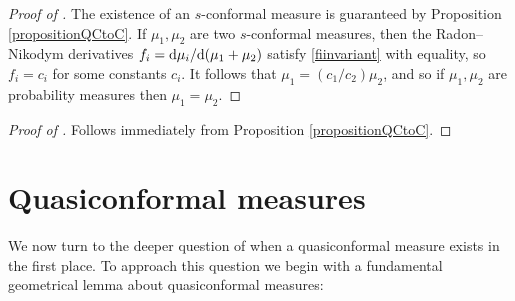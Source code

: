 \begin{proof}[Proof of ]
The existence of an $s$-conformal measure is guaranteed by Proposition \ref{propositionQCtoC}. If $\mu_1,\mu_2$ are two $s$-conformal measures, then the Radon--Nikodym derivatives $f_i = \mathrm{d}\mu_i/\mathrm{d}(\mu_1 + \mu_2)$ satisfy \eqref{fiinvariant} with equality, so $f_i = c_i$ for some constants $c_i$. It follows that $\mu_1 = (c_1/c_2) \mu_2$, and so if $\mu_1,\mu_2$ are probability measures then $\mu_1 = \mu_2$.
\end{proof}
\begin{proof}[Proof of ]
Follows immediately from Proposition \ref{propositionQCtoC}.
\end{proof}


\section{Quasiconformal measures}

We now turn to the deeper question of when a quasiconformal measure exists in the first place. To approach this question we begin with a fundamental geometrical lemma about quasiconformal measures:

